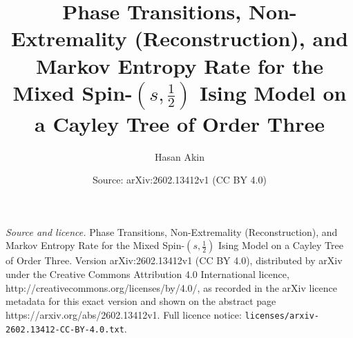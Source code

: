 \documentclass[10pt,a4paper]{amsart}
\title{Phase Transitions, Non-Extremality (Reconstruction), and Markov Entropy Rate for the Mixed Spin-$(s,\tfrac12)$ Ising Model on a Cayley Tree of Order Three}
\author{Hasan Akin}
\date{Source: arXiv:2602.13412v1 (CC BY 4.0)}
\begin{document}
\maketitle

\noindent\emph{Source and licence.} Phase Transitions, Non-Extremality (Reconstruction), and Markov Entropy Rate for the Mixed Spin-$(s,\tfrac12)$ Ising Model on a Cayley Tree of Order Three. Version arXiv:2602.13412v1 (CC BY 4.0), distributed by arXiv under the Creative Commons Attribution 4.0 International licence, http://creativecommons.org/licenses/by/4.0/, as recorded in the arXiv licence metadata for this exact version and shown on the abstract page https://arxiv.org/abs/2602.13412v1. Full licence notice: \texttt{licenses/arxiv-2602.13412-CC-BY-4.0.txt}.\par\smallskip
\end{document}
